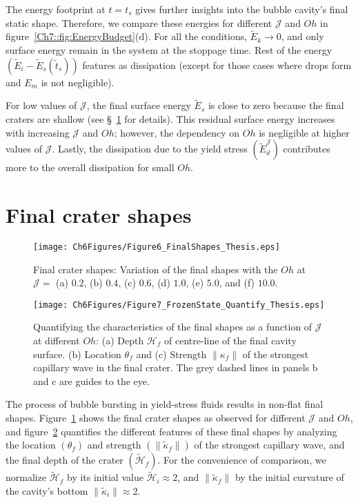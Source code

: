 The energy footprint at $t = t_s$ gives further insights into the bubble cavity's final static shape. Therefore, we compare these energies for different $\mathcal{J}$ and $Oh$ in figure~\ref{Ch7::fig:EnergyBudget}(d). For all the conditions, $\tilde E_k \to 0$, and only surface energy remain in the system at the stoppage time. Rest of the energy $\left(\tilde E_i - \tilde E_s(\tilde t_s)\right)$ features as dissipation (except for those cases where drops form and $E_m$ is not negligible). 

For low values of $\mathcal{J}$, the final surface energy $\tilde E_s$ is close to zero because the final craters are shallow (see \S~\ref{Sec::EquilibriumStates} for details). This residual surface energy increases with increasing $\mathcal{J}$ and $Oh$; however, the dependency on $Oh$ is negligible at higher values of $\mathcal{J}$. Lastly, the dissipation due to the yield stress $\left(\tilde E_d^\mathcal{J}\right)$ contributes more to the overall dissipation for small $Oh$.

\section{Final crater shapes}\label{Sec::EquilibriumStates}

\begin{figure}
	\centering
	\texttt{[image: Ch6Figures/Figure6\_FinalShapes\_Thesis.eps]}
	\caption{Final crater shapes: Variation of the final shapes with the $Oh$ at $\mathcal{J} =$ (a) $0.2$, (b) $0.4$, (c) $0.6$, (d) $1.0$, (e) $5.0$, and (f) $10.0$.}
	\label{Ch7::fig:Zoo_of_Final_Shapes}
\end{figure}

\begin{figure}
	\centering
	\texttt{[image: Ch6Figures/Figure7\_FrozenState\_Quantify\_Thesis.eps]}
	\caption{Quantifying the characteristics of the final shapes as a function of $\mathcal{J}$ at different $Oh$: (a) Depth $\mathcal{H}_f$ of centre-line of the final cavity surface. (b) Location $\theta_f$ and (c) Strength $\|\kappa_f\|$ of the strongest capillary wave in the final crater. The grey dashed lines in panels b and c are guides to the eye.}
	\label{Ch7::fig:Quantification_Final_Shapes}
\end{figure}

The process of bubble bursting in yield-stress fluids results in non-flat final shapes.
Figure~\ref{Ch7::fig:Zoo_of_Final_Shapes} shows the final crater shapes as observed for different $\mathcal{J}$ and $Oh$, and figure~\ref{Ch7::fig:Quantification_Final_Shapes} quantifies the different features of these final shapes by analyzing the location $\left(\theta_f\right)$ and strength $\left(\|\tilde \kappa_f\|\right)$ of the strongest capillary wave, and the final depth of the crater $\left(\tilde{\mathcal{H}}_f\right)$. For the convenience of comparison, we normalize $\tilde{\mathcal{H}}_f$ by its initial value $\tilde{\mathcal{H}}_i \approx 2$, and $\|\tilde \kappa_f\|$ by the initial curvature of the cavity's bottom $\|\tilde \kappa_i\| \approx 2$. 

